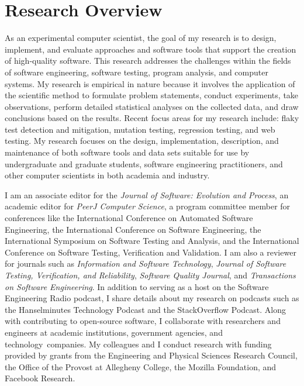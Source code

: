 \documentclass[11pt,letterpaper,sans]{moderncv}
\begin{document}
\vspace*{-.1in}
%
\section{Research Overview}


{\small
  As an experimental computer scientist, the goal of my research is to design,
  implement, and evaluate approaches and software tools that support the
  creation of high-quality software. This research addresses the challenges
  within the fields of software engineering, software testing, program analysis,
  and computer systems. My research is empirical in nature because it involves
  the application of the scientific method to formulate problem statements,
  conduct experiments, take observations, perform detailed statistical analyses
  on the collected data, and draw conclusions based on the results. Recent
  focus areas for my research include: flaky test detection and mitigation,
  mutation testing, regression testing, and web testing. My research
  focuses on the design, implementation, description, and maintenance of both
  software tools and data sets suitable for use by undergraduate and
  graduate students, software engineering practitioners, and other computer
  scientists in both academia and industry.
}

\vspace*{.1in}


{\small
  I am an associate editor for the {\em Journal of Software: Evolution and Process},
  an academic editor for {\em PeerJ Computer Science}, a program
  committee member for conferences like the International Conference on
  Automated Software Engineering, the International Conference on Software
  Engineering, the International Symposium on Software Testing and Analysis, and
  the International Conference on Software Testing, Verification and Validation.
  I am also a reviewer for journals such as {\em Information and Software
  Technology}, {\em Journal of Software Testing, Verification, and Reliability},
  {\em Software Quality Journal}, and {\em Transactions on Software
  Engineering}. In addition to serving as a host on the Software Engineering
  Radio podcast, I share details about my research on podcasts such as the
  Hanselminutes Technology Podcast and the StackOverflow Podcast. Along with
  contributing to open-source software, I collaborate with researchers and
  engineers at academic institutions, government agencies, and
  \mbox{technology companies}. My colleagues and I conduct research with funding
  provided by grants from the Engineering and Physical Sciences Research
  Council, the Office of the Provost at Allegheny College, the Mozilla
  Foundation, and Facebook Research.
}
\end{document}
